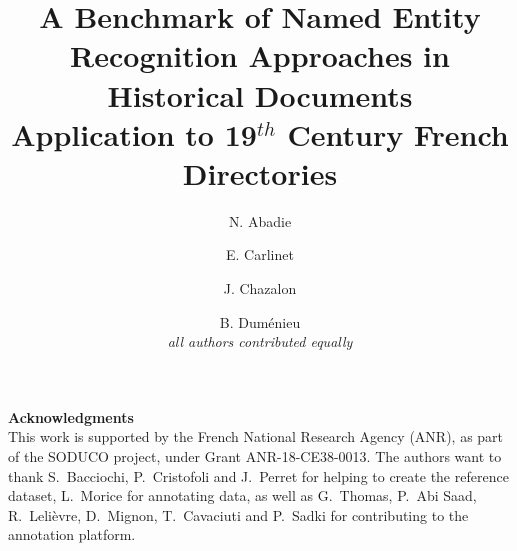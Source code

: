 \documentclass[runningheads,svgnames]{llncs}
\begin{document}
%
\title{A Benchmark of Named Entity Recognition Approaches in Historical Documents\\
Application to 19$^{th}$ Century French Directories%
}
%
%
\author{%
N. Abadie \and
E. Carlinet \and
J. Chazalon \and
B. Duménieu\\
{\footnotesize \emph{all authors contributed equally}}%
}
%
%
%
\maketitle              %
%
\begin{abstract}

\end{abstract}









\bigskip
\noindent\textbf{Acknowledgments}\\
{
\footnotesize
This work is supported by the French National Research Agency (ANR), as part of the SODUCO project, under Grant ANR-18-CE38-0013.
%
The authors want to thank S.~Bacciochi, P.~Cristofoli and J.~Perret for helping to create the reference dataset, 
L.~Morice for annotating data,
as well as G.~Thomas, P.~Abi Saad, R.~Lelièvre, D.~Mignon, T.~Cavaciuti and P.~Sadki for contributing to the annotation platform.
}
%



\end{document}
